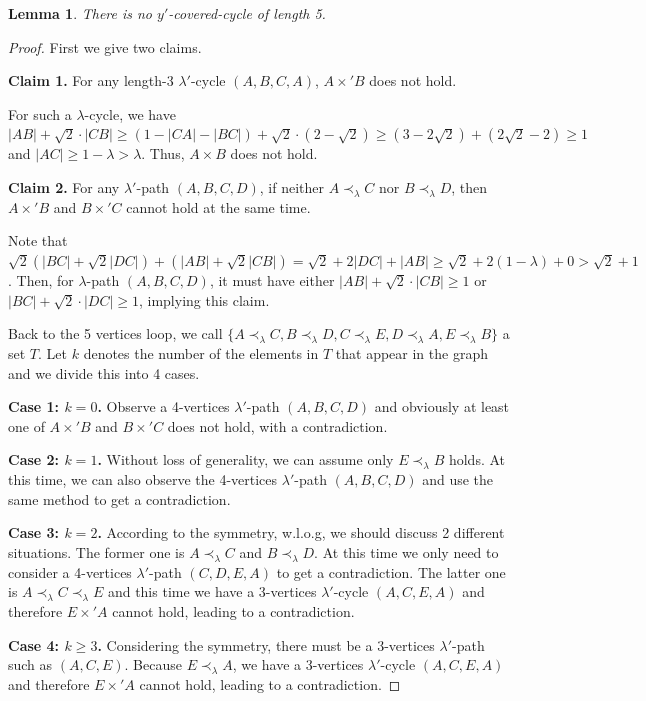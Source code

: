 \documentclass[11pt]{article}
\newtheorem{lemma}[theorem]{Lemma}
\theoremstyle{remark}
\begin{document}
\begin{lemma}
There is no $y'$-covered-cycle of length 5.
\end{lemma}

\begin{proof}
First we give two claims.

\smallskip\noindent\textbf{Claim 1.} For any length-3 $\lambda'$-cycle $(A,B,C,A)$, $A\times' B$ does not hold. %

 For such a $\lambda$-cycle, we have $|AB|+\sqrt2\cdot |CB|\ge (1-|CA|-|BC|) + \sqrt2\cdot (2-\sqrt2) \ge (3-2\sqrt2) + (2\sqrt2-2) \ge 1$ and $|AC|\ge 1-\lambda >\lambda$. Thus, $A\times B$ does not hold.

\smallskip\noindent\textbf{Claim 2.} For any $\lambda'$-path $(A,B,C,D)$, if neither $A\prec_{\lambda} C$ nor $B\prec_{\lambda} D$, then $A\times' B$ and $B\times' C$ cannot hold at the same time.

 Note that $\sqrt2(|BC|+\sqrt2|DC|)+(|AB|+\sqrt2|CB|)=\sqrt2+2|DC|+|AB|\ge \sqrt2 + 2(1-\lambda)+0>\sqrt2+1$. Then, for $\lambda$-path $(A,B,C,D)$, it must have either $|AB|+\sqrt2 \cdot |CB|\ge1$ or $|BC|+\sqrt2 \cdot |DC|\ge1$, implying this claim.

 Back to the 5 vertices loop, we call $\{A\prec_{\lambda}C,B\prec_{\lambda}D,C\prec_{\lambda}E,D\prec_{\lambda}A,E\prec_{\lambda}B\}$ a set $T$. Let $k$ denotes the number of the elements in $T$ that appear in the graph and we divide this into 4 cases.

\noindent\textbf{Case 1: $k=0$.}
Observe a 4-vertices $\lambda'$-path $(A,B,C,D)$ and obviously at least one of $A\times' B$ and $B\times' C$ does not hold, with a contradiction.

\noindent\textbf{Case 2: $k=1$.}
Without loss of generality, we can assume only $E\prec_{\lambda}B$ holds. At this time, we can also observe the 4-vertices $\lambda'$-path $(A,B,C,D)$ and use the same method to get a contradiction.

\noindent\textbf{Case 3: $k=2$.}
According to the symmetry, w.l.o.g, we should discuss 2 different situations. The former one is $A\prec_{\lambda}C$ and $B\prec_{\lambda}D$. At this time we only need to consider a 4-vertices $\lambda'$-path $(C,D,E,A)$ to get a contradiction. The latter one is $A\prec_{\lambda}C\prec_{\lambda}E$ and this time we have a 3-vertices $\lambda'$-cycle $(A,C,E,A)$ and therefore $E\times' A$ cannot hold, leading to a contradiction.

\noindent\textbf{Case 4: $k\ge3$.}
Considering the symmetry, there must be a 3-vertices $\lambda'$-path such as $(A,C,E)$. Because $E\prec_{\lambda}A$, we have a 3-vertices $\lambda'$-cycle $(A,C,E,A)$ and therefore $E\times' A$ cannot hold, leading to a contradiction.
\end{proof}
\end{document}
